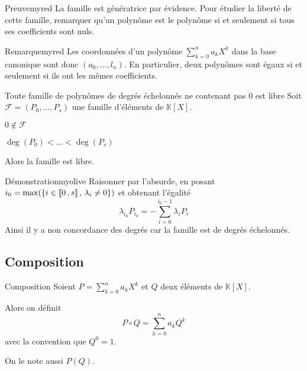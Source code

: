     \begin{demo}{Preuve}{myred}
        La famille est génératrice par évidence. Pour étudier la liberté de cette famille, remarquer qu’un polynôme est le polynôme si et seulement si tous ses coefficients sont nuls.
    \end{demo}

    \begin{omed}{Remarque}{myred}
        Les coordonnées d’un polynôme $\sum\limits_{k=0}^n a_k X^k$ dans la base canonique sont donc $(a_0,\ldots,l_n)$. En particulier, deux polynômes sont égaux si et seulement si ils ont les mêmes coefficients.
    \end{omed}

    \begin{prop}{Toute famille de polynômes de degrés échelonnés ne contenant pas 0 est libre}{}
        Soit $\mathcal{F} = (P_0, \ldots, P_s)$ une famille d’éléments de $\mathbb{K}[X]$. \newline
        \begin{suppose}
            \item $0 \notin \mathcal{F}$
            \item $ \deg(P_0) < \ldots < \deg(P_s) $
        \end{suppose}
        Alors la famille est libre.
    \end{prop}
    
    \begin{demo}{Démonstration}{myolive}
        Raisonner par l’absurde, en posant  $i_0 = \max(\{i \in \left\llbracket 0 \, , s \right\rrbracket, \, \lambda_i \neq 0\})$ et obtenant l’égalité \[ \lambda_{i_0}P_{i_0} = -\sum\limits_{i=0}^{i_0 -1} \lambda_i P_i\] 
        Ainsi il y a non concordance des degrés car la famille est de degrés échelonnés.
    \end{demo}

\subsection{Composition}

    \begin{defi}{Composition}{}
        Soient $P = \sum\limits_{k = 0}^n a_k X^k$ et $Q$ deux éléments de $\mathbb{K}[X]$.
    
        Alors on définit \[ P \circ Q = \sum\limits_{k = 0}^n a_k Q^k \] avec la convention que $Q^0 = 1$.
        
        On le note aussi $P(Q)$.
    \end{defi}

